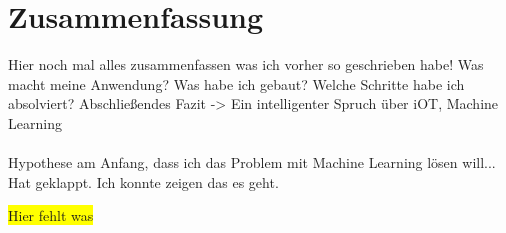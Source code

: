 \chapter{Zusammenfassung}
\label{ch:zusammenfassung}
Hier noch mal alles zusammenfassen was ich vorher so geschrieben habe! Was macht meine Anwendung? Was habe ich gebaut?
Welche Schritte habe ich absolviert? Abschließendes Fazit -> Ein intelligenter Spruch über iOT, Machine Learning
\\ \\
Hypothese am Anfang, dass ich das Problem mit Machine Learning lösen will... Hat geklappt. Ich konnte zeigen das es geht.

\colorbox{yellow}{Hier fehlt was}